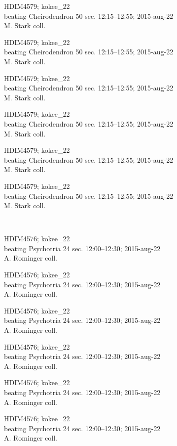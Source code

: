 \documentclass[2pt]{extarticle}
\begin{document}
\noindent
\parbox{0.16\textwidth}{\tiny \raggedright \rule[-0.3\baselineskip]{0pt}{10pt}HDIM4579; kokee\_22\\ beating Cheirodendron 50 sec. 12:15--12:55; 2015-aug-22\\ M. Stark coll.}
\parbox{0.16\textwidth}{\tiny \raggedright \rule[-0.3\baselineskip]{0pt}{10pt}HDIM4579; kokee\_22\\ beating Cheirodendron 50 sec. 12:15--12:55; 2015-aug-22\\ M. Stark coll.}
\parbox{0.16\textwidth}{\tiny \raggedright \rule[-0.3\baselineskip]{0pt}{10pt}HDIM4579; kokee\_22\\ beating Cheirodendron 50 sec. 12:15--12:55; 2015-aug-22\\ M. Stark coll.}
\parbox{0.16\textwidth}{\tiny \raggedright \rule[-0.3\baselineskip]{0pt}{10pt}HDIM4579; kokee\_22\\ beating Cheirodendron 50 sec. 12:15--12:55; 2015-aug-22\\ M. Stark coll.}
\parbox{0.16\textwidth}{\tiny \raggedright \rule[-0.3\baselineskip]{0pt}{10pt}HDIM4579; kokee\_22\\ beating Cheirodendron 50 sec. 12:15--12:55; 2015-aug-22\\ M. Stark coll.}
\parbox{0.16\textwidth}{\tiny \raggedright \rule[-0.3\baselineskip]{0pt}{10pt}HDIM4579; kokee\_22\\ beating Cheirodendron 50 sec. 12:15--12:55; 2015-aug-22\\ M. Stark coll.} \\ 
\vspace{0.001in} 

\noindent
\parbox{0.16\textwidth}{\tiny \raggedright \rule[-0.3\baselineskip]{0pt}{10pt}HDIM4576; kokee\_22\\ beating Psychotria 24 sec. 12:00--12:30; 2015-aug-22\\ A. Rominger coll.}
\parbox{0.16\textwidth}{\tiny \raggedright \rule[-0.3\baselineskip]{0pt}{10pt}HDIM4576; kokee\_22\\ beating Psychotria 24 sec. 12:00--12:30; 2015-aug-22\\ A. Rominger coll.}
\parbox{0.16\textwidth}{\tiny \raggedright \rule[-0.3\baselineskip]{0pt}{10pt}HDIM4576; kokee\_22\\ beating Psychotria 24 sec. 12:00--12:30; 2015-aug-22\\ A. Rominger coll.}
\parbox{0.16\textwidth}{\tiny \raggedright \rule[-0.3\baselineskip]{0pt}{10pt}HDIM4576; kokee\_22\\ beating Psychotria 24 sec. 12:00--12:30; 2015-aug-22\\ A. Rominger coll.}
\parbox{0.16\textwidth}{\tiny \raggedright \rule[-0.3\baselineskip]{0pt}{10pt}HDIM4576; kokee\_22\\ beating Psychotria 24 sec. 12:00--12:30; 2015-aug-22\\ A. Rominger coll.}
\parbox{0.16\textwidth}{\tiny \raggedright \rule[-0.3\baselineskip]{0pt}{10pt}HDIM4576; kokee\_22\\ beating Psychotria 24 sec. 12:00--12:30; 2015-aug-22\\ A. Rominger coll.} \\ 
\vspace{0.001in} 
\end{document}
